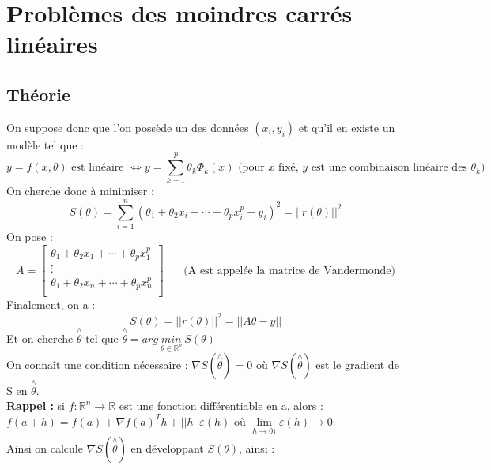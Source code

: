 \documentclass[a4paper,10pt]{report}
\begin{document}
\section{Problèmes des moindres carrés linéaires}
\subsection{Théorie}
On suppose donc que l'on possède un des données $(x_i,y_i)$ et qu'il en existe un modèle tel que :
\abovedisplayskip=0mm
\begin{displaymath}
y=f(x,\theta) \text{ est linéaire } \Leftrightarrow y=\sum \limits^{p}_{k=1} \theta_k\Phi_k(x) \text{ (pour $x$ fixé, $y$ est une combinaison linéaire des $\theta_k$)}
\end{displaymath}
On cherche donc à minimiser :
\abovedisplayskip=0mm
\begin{displaymath}
S(\theta)= \sum \limits^{n}_{i=1} (\theta_1 + \theta_2 x_i + \cdots + \theta_p x_i^p - y_i)^2 = ||r(\theta)||^2
\end{displaymath}
On pose :
\abovedisplayskip=0mm
\begin{displaymath}
A=\left[ \begin{array}{c}
\theta_1 + \theta_2 x_1 + \cdots + \theta_p x_1^p \\
\vdots \\
\theta_1 + \theta_2 x_n + \cdots + \theta_p x_n^p \\
\end{array} \right] \ \ \ \ \ \ \ \ \text{(A est appelée la matrice de Vandermonde)}
\end{displaymath}
Finalement, on a :
\abovedisplayskip=0mm
\begin{displaymath}
S(\theta)= ||r(\theta)||^2 = ||A\theta - y||
\end{displaymath}
Et on cherche $\overset{\wedge}{\theta}$ tel que $\overset{\wedge}{\theta }=arg \ \underset{\theta \in \mathbb{R}^p}{min} \ S(\theta)$\\
On connaît une condition nécessaire : $\nabla S(\overset{\wedge}{\theta})=0$ où $\nabla S(\overset{\wedge}{\theta})$ est le gradient de S en $\overset{\wedge}{\theta}$. \\
\textbf{Rappel :} si $f:\mathbb{R}^n\rightarrow \mathbb{R}$ est une fonction différentiable en a, alors :\\
$f(a+h)=f(a)+\nabla f(a)^Th + ||h||\varepsilon(h)$ où $\lim \limits_{h\rightarrow 0)} \varepsilon(h) \rightarrow 0$\\
Ainsi on calcule $\nabla S(\overset{\wedge}{\theta})$ en développant $S(\theta)$, ainsi :
\end{document}
